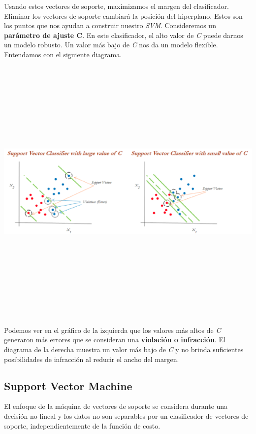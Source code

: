 \documentclass[
]{book}
\begin{document}
Usando estos vectores de soporte, maximizamos el margen del clasificador. Eliminar los vectores de soporte cambiará la posición del hiperplano. Estos son los puntos que nos ayudan a construir nuestro \emph{SVM}. Consideremos un \textbf{parámetro de ajuste C}. En este clasificador, el alto valor de \emph{C} puede darnos un modelo robusto. Un valor más bajo de \emph{C} nos da un modelo flexible. Entendamos con el siguiente diagrama.

\begin{center}\includegraphics[width=900pt,height=380pt]{img/03-svm/03_support_vector_classifier} \end{center}

Podemos ver en el gráfico de la izquierda que los valores más altos de \emph{C} generaron más errores que se consideran una \textbf{violación o infracción}. El diagrama de la derecha muestra un valor más bajo de \emph{C} y no brinda suficientes posibilidades de infracción al reducir el ancho del margen.

\hypertarget{support-vector-machine}{%
\subsection{Support Vector Machine}\label{support-vector-machine}}

El enfoque de la máquina de vectores de soporte se considera durante una decisión no lineal y los datos no son separables por un clasificador de vectores de soporte, independientemente de la función de costo.
\end{document}
